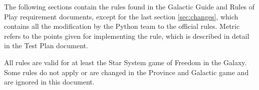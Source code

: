 \documentclass[a4wide]{article}
\newcounter{rc}
\begin{document}
The following sections contain the rules found in the Galactic Guide and Rules of Play requirement documents, except for the last section \ref{sec:changes}, which contains all the modification by the Python team to the official rules. Metric refers to the points given for implementing the rule, which is described in detail in the Test Plan document.

All rules are valid for at least the Star System game of Freedom in the Galaxy. Some rules do not apply or are changed in the Province and Galactic game and are ignored in this document.

\newcommand{\first}{.5cm}
\newcommand{\second}{12.0cm}
\newcommand{\third}{2.25cm}
\newcommand{\fourth}{1.25cm}








































\end{document}
